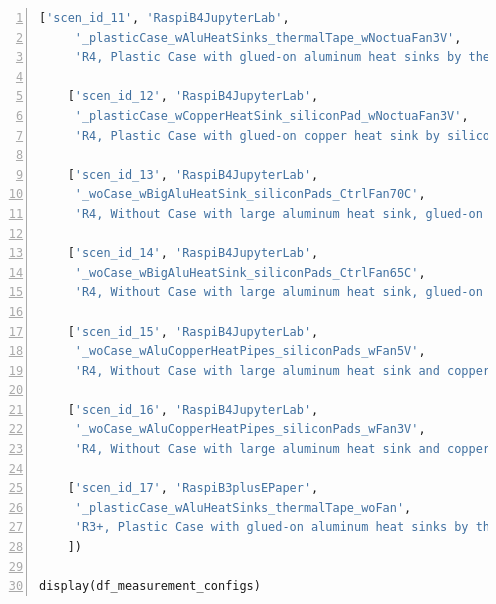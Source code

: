 \documentclass[10pt,parskip=half,
toc=sectionentrywithdots,
bibliography=totocnumbered,
captions=tableheading,numbers=noendperiod]{scrartcl}
\begin{document}
\begin{codecell}[H]
\begin{lstlisting}[language=Python,numbers=left,xleftmargin=20pt,xrightmargin=5pt,belowskip=5pt,aboveskip=5pt]
    ['scen_id_11', 'RaspiB4JupyterLab',
     '_plasticCase_wAluHeatSinks_thermalTape_wNoctuaFan3V',
     'R4, Plastic Case with glued-on aluminum heat sinks by thermal tape, with Noctua fan (3.3 V)'],

    ['scen_id_12', 'RaspiB4JupyterLab',
     '_plasticCase_wCopperHeatSink_siliconPad_wNoctuaFan3V',
     'R4, Plastic Case with glued-on copper heat sink by silicone pad, with Noctua fan (3.3 V)'],

    ['scen_id_13', 'RaspiB4JupyterLab',
     '_woCase_wBigAluHeatSink_siliconPads_CtrlFan70C',
     'R4, Without Case with large aluminum heat sink, glued-on by silicone pads, with ctrl fan (switch-on: 70 $^\circ$C)'],

    ['scen_id_14', 'RaspiB4JupyterLab',
     '_woCase_wBigAluHeatSink_siliconPads_CtrlFan65C',
     'R4, Without Case with large aluminum heat sink, glued-on by silicone pads, with ctrl fan (switch-on: 65 $^\circ$C)'],

    ['scen_id_15', 'RaspiB4JupyterLab',
     '_woCase_wAluCopperHeatPipes_siliconPads_wFan5V',
     'R4, Without Case with large aluminum heat sink and copper heat pipes, glued-on by silicone pads, with fan (5 V)'],

    ['scen_id_16', 'RaspiB4JupyterLab',
     '_woCase_wAluCopperHeatPipes_siliconPads_wFan3V',
     'R4, Without Case with large aluminum heat sink and copper heat pipes, glued-on by silicone pads, with fan (3.3 V)'],

    ['scen_id_17', 'RaspiB3plusEPaper',
     '_plasticCase_wAluHeatSinks_thermalTape_woFan',
     'R3+, Plastic Case with glued-on aluminum heat sinks by thermal tape, without fan']
    ])

display(df_measurement_configs)
\end{lstlisting}\end{codecell}
\end{document}
